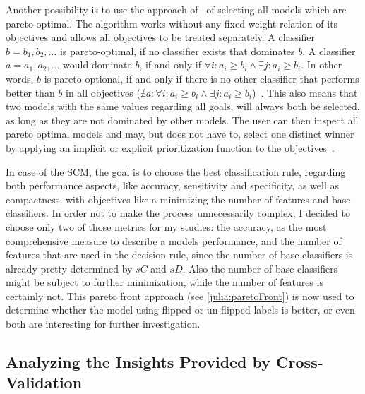 Another possibility is to use the approach of~\cite{muessel} of selecting all models which are pareto-optimal.
The algorithm works without any fixed weight relation of its objectives and allows all objectives to be treated separately.
A classifier \(b={b_1, b_2, \ldots}\) is pareto-optimal, if no classifier exists that dominates \(b\).
A classifier \(a={a_1, a_2, \ldots}\) would dominate \(b\), if and only if \(\forall i: a_i \geq b_i \land \exists j: a_i \ge b_i\).
In other words, \(b\) is pareto-optional, if and only if there is no other classifier that performs better than \(b\) in
all objectives (\(\nexists a: \forall i: a_i \geq b_i \land \exists j: a_i \ge b_i\))~\citep{muessel}.
This also means that two models with the same values regarding all goals, will always both be selected,
as long as they are not dominated by other models.
The user can then inspect all pareto optimal models and may, but does not have to, select one distinct winner by 
applying an implicit or explicit prioritization function to the objectives~\citep{muessel}.

In case of the SCM, the goal is to choose the best classification rule, regarding both performance aspects, like accuracy,
sensitivity and specificity, as well as compactness, with objectives like a minimizing the number of features and base classifiers.
In order not to make the process unnecessarily complex, I decided to choose only two of those metrics for my studies:
the accuracy, as the most comprehensive measure to describe a models performance, and the number
of features that are used in the decision rule, since the number of base classifiers is already pretty determined by \(sC\) and \(sD\).
Also the number of base classifiers might be subject to further minimization, while the number of features is certainly not.
This pareto front approach (see \autoref{julia:paretoFront}) is now used to determine
whether the model using flipped or un-flipped labels is better, or even both are interesting for
further investigation.

\subsection{Analyzing the Insights Provided by Cross-Validation}\label{subsec:cvOutcomes}

